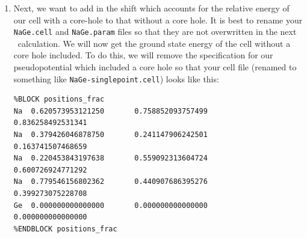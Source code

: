 \documentclass[a4paper,11pt,twoside]{book}
\begin{document}
{\begin{enumerate}
\begin{verbatim}
%BLOCK species_pot
Ge:exc 3|1.5|13|15|17|30U:31U:32:40:41(qc=6){1s1}
Na 2|1.3|14|16|18|20U:30:21(qc=7)
%ENDBLOCK species_pot
\end{verbatim}
Once the \castep\ calculation is completed, run \optados\ and look at the output. You will see that the energy range of the spectrum is from 0 eV to 30 eV, as we have not yet applied the Mizoguchi chemical shift term
\item Next, we want to add in the shift which accounts for the relative energy of our cell with a core-hole to that without a core hole. It is best to rename your \verb#NaGe.cell# and \verb#NaGe.param# files so that they are not overwritten in the next \castep\ calculation. We will now get the ground state energy of the cell without a core hole included. To do this, we will remove the specification for our pseudopotential which included a core hole so that your cell file (renamed to something like \verb#NaGe-singlepoint.cell#) looks like this:
\begin{verbatim}
%BLOCK positions_frac
Na  0.620573953121250       0.758852093757499       0.836258492531341
Na  0.379426046878750       0.241147906242501       0.163741507468659
Na  0.220453843197638       0.559092313604724       0.600726924771292
Na  0.779546156802362       0.440907686395276       0.399273075228708
Ge  0.000000000000000       0.000000000000000       0.000000000000000
%ENDBLOCK positions_frac


\end{verbatim}
\end{enumerate}}
\end{document}
